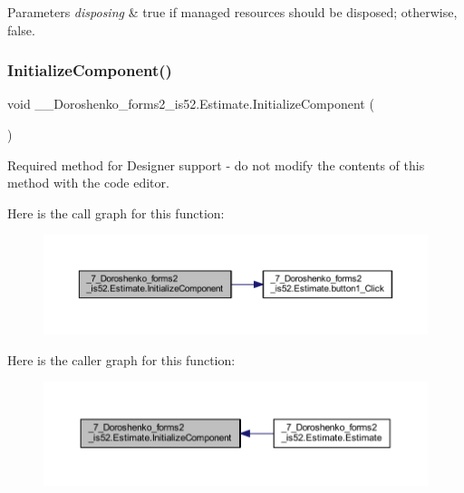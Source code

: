 \begin{DoxyParams}{Parameters}
{\em disposing} & true if managed resources should be disposed; otherwise, false.\\
\hline
\end{DoxyParams}
\hypertarget{class__7___doroshenko__forms2__is52_1_1_estimate_aeedb1a70eec0fed7344014a1fe63c5f2}{}\label{class__7___doroshenko__forms2__is52_1_1_estimate_aeedb1a70eec0fed7344014a1fe63c5f2} 
\subsubsection{\texorpdfstring{Initialize\+Component()}{InitializeComponent()}}
{\footnotesize\ttfamily void \+\_\+\_\+\+Doroshenko\+\_\+forms2\+\_\+is52.\+Estimate.\+Initialize\+Component (\begin{DoxyParamCaption}{ }\end{DoxyParamCaption})\hspace{0.3cm}{\ttfamily [private]}}



Required method for Designer support -\/ do not modify the contents of this method with the code editor. 

Here is the call graph for this function\+:
\nopagebreak
\begin{figure}[H]
\begin{center}
\leavevmode
\includegraphics[width=350pt]{class__7___doroshenko__forms2__is52_1_1_estimate_aeedb1a70eec0fed7344014a1fe63c5f2_cgraph}
\end{center}
\end{figure}
Here is the caller graph for this function\+:
\nopagebreak
\begin{figure}[H]
\begin{center}
\leavevmode
\includegraphics[width=350pt]{class__7___doroshenko__forms2__is52_1_1_estimate_aeedb1a70eec0fed7344014a1fe63c5f2_icgraph}
\end{center}
\end{figure}


